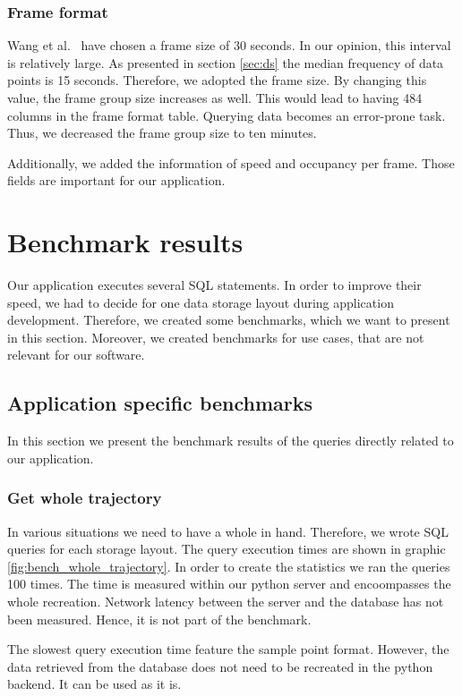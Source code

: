 \documentclass[10pt]{sig-alternate}
\begin{document}
\subsubsection{Frame format}
Wang et al.~\cite{wang} have chosen a frame size of 30 seconds. In our opinion, this interval is relatively large. As presented in section \ref{sec:ds} the median frequency of data points is 15 seconds. Therefore, we adopted the frame size. By changing this value, the frame group size increases as well. This would lead to having 484 columns in the frame format table. Querying data becomes an error-prone task. Thus, we decreased the frame group size to ten minutes.

Additionally, we added the information of speed and occupancy per frame. Those fields are important for our application.

\section{Benchmark results}
Our application executes several SQL statements. In order to improve their speed, we had to decide for one data storage layout during application development. Therefore, we created some benchmarks, which we want to present in this section. Moreover, we created benchmarks for use cases, that are not relevant for our software.

\subsection{Application specific benchmarks}
In this section we present the benchmark results of the queries directly related to our application.

\subsubsection{Get whole trajectory}
In various situations we need to have a whole in hand. Therefore, we wrote SQL queries for each storage layout. The query execution times are shown in graphic \ref{fig:bench_whole_trajectory}. In order to create the statistics we ran the queries 100 times. The time is measured within our python server and encoompasses the whole recreation. Network latency between the server and the database has not been measured. Hence, it is not part of the benchmark.

The slowest query execution time feature the sample point format. However, the data retrieved from the database does not need to be recreated in the python backend. It can be used as it is.
\end{document}
